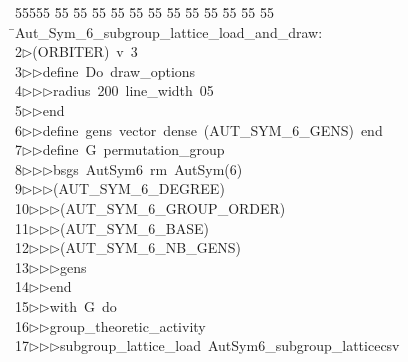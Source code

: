 %
%
\begin{tabbing}
55555 \= 55 \= 55 \= 55 \= 55 \= 55 \= 55 \= 55 \= 55 \= 55 \= 55 \= 55 \= 55 \= \>Aut\_Sym\_6\_subgroup\_lattice\_load\_and\_draw:\\[0pt]
2\>$\triangleright$\>(ORBITER)\ v\ 3\ \\[0pt]
3\>$\triangleright$\>$\triangleright$\>define\ Do\ draw\_options\ \\[0pt]
4\>$\triangleright$\>$\triangleright$\>$\triangleright$\>radius\ 200\ line\_width\ 05\ \\[0pt]
5\>$\triangleright$\>$\triangleright$\>end\ \\[0pt]
6\>$\triangleright$\>$\triangleright$\>define\ gens\ vector\ dense\ (AUT\_SYM\_6\_GENS)\ end\ \\[0pt]
7\>$\triangleright$\>$\triangleright$\>define\ G\ permutation\_group\ \\[0pt]
8\>$\triangleright$\>$\triangleright$\>$\triangleright$\>bsgs\ AutSym6\ rm\ AutSym(6)\ \\[0pt]
9\>$\triangleright$\>$\triangleright$\>$\triangleright$\>(AUT\_SYM\_6\_DEGREE)\ \\[0pt]
10\>$\triangleright$\>$\triangleright$\>$\triangleright$\>(AUT\_SYM\_6\_GROUP\_ORDER)\ \\[0pt]
11\>$\triangleright$\>$\triangleright$\>$\triangleright$\>(AUT\_SYM\_6\_BASE)\ \\[0pt]
12\>$\triangleright$\>$\triangleright$\>$\triangleright$\>(AUT\_SYM\_6\_NB\_GENS)\ \\[0pt]
13\>$\triangleright$\>$\triangleright$\>$\triangleright$\>gens\ \\[0pt]
14\>$\triangleright$\>$\triangleright$\>end\ \\[0pt]
15\>$\triangleright$\>$\triangleright$\>with\ G\ do\ \\[0pt]
16\>$\triangleright$\>$\triangleright$\>group\_theoretic\_activity\ \\[0pt]
17\>$\triangleright$\>$\triangleright$\>$\triangleright$\>subgroup\_lattice\_load\ AutSym6\_subgroup\_latticecsv\ \\[0pt]

\end{tabbing}
